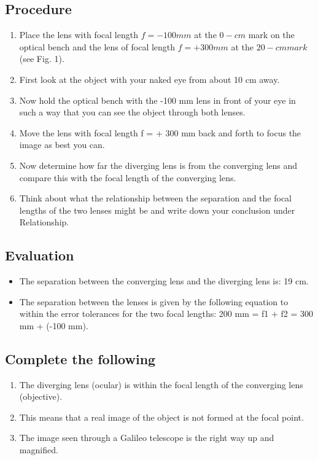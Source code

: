 \documentclass[12pt]{article}
\begin{document}
\subsection*{Procedure}
\begin{enumerate}
    \item Place the lens with focal length $f = - 100 mm$ at the $0-cm$ mark on the optical bench and the lens of focal length $f= + 300 mm$ at the $20-cm mark$ (see Fig. 1). 
    \item First look at the object with your naked eye from about 10 cm away.  
    \item Now hold the optical bench with the -100 mm lens in front of your eye in such a way that you can see the object through both lenses. 
    \item Move the lens with focal length f = + 300 mm back and forth to focus the image as best you can. 
    \item Now determine how far the diverging lens is from the converging lens and compare this with the focal length of the converging lens. 
    \item Think about what the relationship between the separation and the focal lengths of the two lenses might be and write down your conclusion under Relationship.
\end{enumerate}

\subsection*{Evaluation}
\begin{itemize}
    \item The separation between the converging lens and the diverging lens is: 19 cm. 
    \item  The separation between the lenses is given by the following equation to within the error tolerances for the two focal lengths: 200 mm = f1 + f2 = 300 mm + (-100 mm). 
\end{itemize}
    
\subsection*{Complete the following}
\begin{enumerate}
    \item The diverging lens (ocular) is within the focal length of the converging lens (objective). 
    \item This means that a real image of the object is not formed at the focal point. 
    \item The image seen through a Galileo telescope is the right way up and magnified. 
\end{enumerate}
\end{document}
